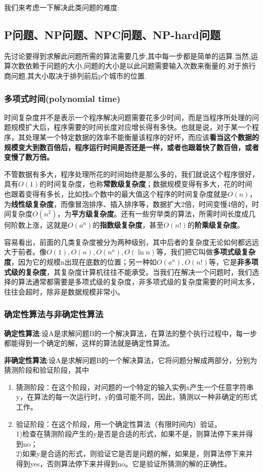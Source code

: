 \documentclass[11pt,a4paper,oneside]{book}
\begin{document}
我们来考虑一下解决此类问题的难度:
\subsection{P问题、NP问题、NPC问题、NP-hard问题}

先讨论要得到求解此问题所需的算法需要几步,其中每一步都是简单的运算.当然,运算次数依赖于问题的大小,问题的大小是以此问题需要输入次数来衡量的.对于旅行商问题,其大小取决于排列前后p个城市的位置.

\subsubsection{多项式时间(polynomial time)}
时间复杂度并不是表示一个程序解决问题需要花多少时间，而是当程序所处理的问题规模扩大后，程序需要的时间长度对应增长得有多快。也就是说，对于某一个程序，其处理某一个特定数据的效率不能衡量该程序的好坏，而应该\textbf{看当这个数据的规模变大到数百倍后，程序运行时间是否还是一样，或者也跟着快了数百倍，或者变慢了数万倍。}

不管数据有多大，程序处理所花的时间始终是那么多的，我们就说这个程序很好，具有$ O(1) $的时间复杂度，也称\textbf{常数级复杂度}；数据规模变得有多大，花的时间也跟着变得有多长，比如找n个数中的最大值这个程序的时间复杂度就是$ O(n) $，为\textbf{线性级复杂度}，而像冒泡排序、插入排序等，数据扩大2倍，时间变慢4倍的，时间复杂度$ O(n^2) $，为\textbf{平方级复杂度}。还有一些穷举类的算法，所需时间长度成几何阶数上涨，这就是$ O(a^n) $的\textbf{指数级复杂度}，甚至$ O(n!) $的\textbf{阶乘级复杂度}。

容易看出，前面的几类复杂度被分为两种级别，其中后者的复杂度无论如何都远远大于前者。像$ O(1), O(n), O(n^a),O(\ln n) $等，我们把它叫做\textbf{多项式级复杂度}，因为它的规模n出现在底数的位置；另一种如$ O(a^n), O(n!) $等，它是\textbf{非多项式级的复杂度}，其复杂度计算机往往不能承受。当我们在解决一个问题时，我们选择的算法通常都需要是多项式级的复杂度，非多项式级的复杂度需要的时间太多，往往会超时，除非是数据规模非常小。

\subsubsection{确定性算法与非确定性算法}
\textbf{确定性算法}:设A是求解问题B的一个解决算法，在算法的整个执行过程中，每一步都能得到一个确定的解，这样的算法就是确定性算法。

\textbf{非确定性算法}:设A是求解问题B的一个解决算法，它将问题分解成两部分，分别为猜测阶段和验证阶段，其中
\begin{enumerate}
	\item 猜测阶段：在这个阶段，对问题的一个特定的输入实例x产生一个任意字符串y，在算法的每一次运行时，y的值可能不同，因此，猜测以一种非确定的形式工作。
	\item 验证阶段：在这个阶段，用一个确定性算法（有限时间内）验证。\\
	1)检查在猜测阶段产生的y是否是合适的形式，如果不是，则算法停下来并得到no；\\
	2)如果y是合适的形式，则验证它是否是问题的解，如果是，则算法停下来并得到yes，否则算法停下来并得到no。它是验证所猜测的解的正确性。
\end{enumerate}
\end{document}
